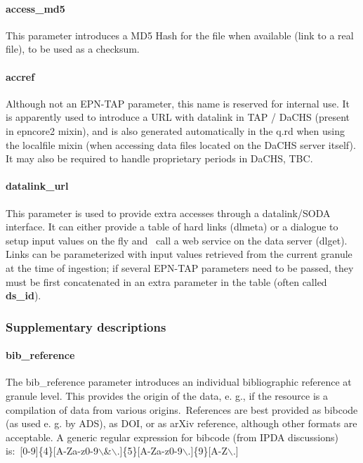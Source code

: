 \documentclass[11pt,a4paper]{ivoa}
\begin{document}
\paragraph{access\_md5}

This parameter introduces a MD5 Hash for the file when available (link to a real file), to be used as a checksum.\\

\paragraph{accref}

Although not an EPN-TAP parameter, this name is reserved for internal use. It is apparently used to introduce a URL with datalink in TAP / DaCHS (present in epncore2 mixin), and is also generated automatically in the q.rd when using the localfile mixin (when accessing data files located on the DaCHS server itself). It may also be required to handle proprietary periods in DaCHS, TBC. \\

\paragraph{datalink\_url}

This parameter is used to provide extra accesses through a datalink/SODA interface. It can either provide a table of hard links (dlmeta) or a dialogue to setup input values on the fly and  call a web service on the data server (dlget). Links can be parameterized with input values retrieved from the current granule at the time of ingestion; if several EPN-TAP parameters need to be passed, they must be first concatenated in an extra parameter in the table (often called \textbf{ds\_id}).

\subsubsection{Supplementary descriptions\\}

\paragraph{bib\_reference}

The bib\_reference parameter introduces an individual bibliographic reference at granule level. This provides the origin of the data, e. g., if the resource is a compilation of data from various origins. References are best provided as bibcode (as used e. g. by ADS), as DOI, or as arXiv reference, although other formats are acceptable. A generic regular expression for bibcode (from IPDA discussions) is: [0-9]\{4\}[A-Za-z0-9$\backslash$\&$\backslash$.]\{5\}[A-Za-z0-9$\backslash$.]\{9\}[A-Z$\backslash$.] 
\end{document}
